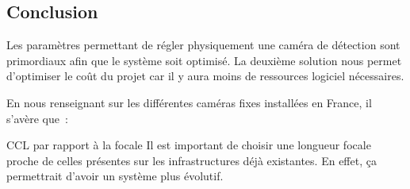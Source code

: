 \subsection{Conclusion}
\label{Conclusion}
Les paramètres permettant de régler physiquement une caméra de détection sont primordiaux afin que le système soit optimisé.
La deuxième solution nous permet d’optimiser le coût du projet car il y aura moins de ressources logiciel nécessaires.

En nous renseignant sur les différentes caméras fixes installées en France, il s’avère que :

CCL par rapport à la focale Il est important de choisir une longueur focale proche de celles présentes sur les infrastructures déjà existantes. En effet, ça permettrait d'avoir un système plus évolutif.
